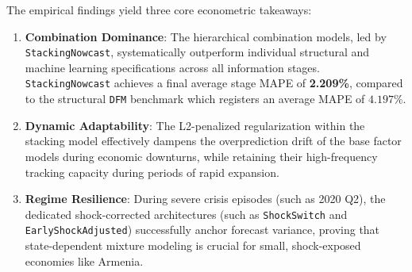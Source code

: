 \documentclass[12pt,a4paper]{article}
\begin{document}
The empirical findings yield three core econometric takeaways:
\begin{enumerate}
    \item \textbf{Combination Dominance}: The hierarchical combination models, led by \texttt{StackingNowcast}, systematically outperform individual structural and machine learning specifications across all information stages. \texttt{StackingNowcast} achieves a final average stage MAPE of \textbf{2.209\%}, compared to the structural \texttt{DFM} benchmark which registers an average MAPE of $4.197\%$.
    \item \textbf{Dynamic Adaptability}: The L2-penalized regularization within the stacking model effectively dampens the overprediction drift of the base factor models during economic downturns, while retaining their high-frequency tracking capacity during periods of rapid expansion.
    \item \textbf{Regime Resilience}: During severe crisis episodes (such as 2020 Q2), the dedicated shock-corrected architectures (such as \texttt{ShockSwitch} and \texttt{EarlyShockAdjusted}) successfully anchor forecast variance, proving that state-dependent mixture modeling is crucial for small, shock-exposed economies like Armenia.
\end{enumerate}
\end{document}
